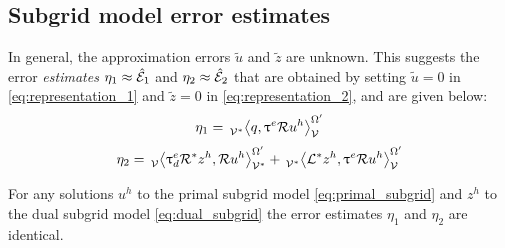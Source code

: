\subsection{Subgrid model error estimates}

In general, the approximation errors $\tilde{u}$
and $\tilde{z}$ are unknown. This suggests the
error \emph{estimates} $\eta_1 \approx \hat{\mathcal{E}}_1$
and $\eta_2 \approx \hat{\mathcal{E}}_2$ that are obtained
by setting $\tilde{u} = 0$ in \eqref{eq:representation_1}
and $\tilde{z} = 0$ in \eqref{eq:representation_2}, and
are given below:
%
\begin{gather}
\eta_1 = \,{}_{\mathcal{V}^*}^{}\!\left< {q}, {\uptau^e \mathcal{R} u^h} \right>_{\mathcal{V}}^{\Omega'}
\label{eq:estimate_1}
\end{gather}
%
\begin{gather}
\eta_2 =
\,{}_{\mathcal{V}}^{}\!\left< {\uptau^e_d \mathcal{R}^* z^h}, {\mathcal{R} u^h} \right>_{\mathcal{V}^*}^{\Omega'} +
\,{}_{\mathcal{V}^*}^{}\!\left< {\mathcal{L}^* z^h}, {\uptau^e \mathcal{R} u^h} \right>_{\mathcal{V}}^{\Omega'}
\label{eq:estimate_2}
\end{gather}

\begin{prop}
For any solutions $u^h$ to the primal subgrid model
\eqref{eq:primal_subgrid} and $z^h$ to the dual
subgrid model \eqref{eq:dual_subgrid} the error estimates
$\eta_1$ and $\eta_2$ are identical.
\end{prop}

